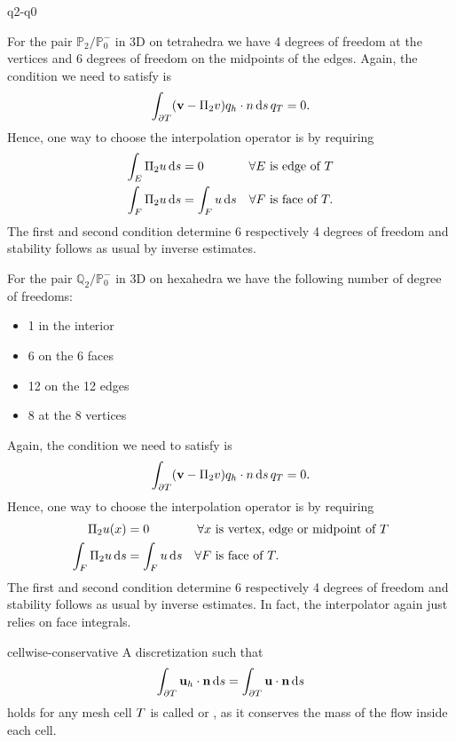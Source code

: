 \begin{Problem}{q2-q0}
\begin{solution}
  For the pair $\mathbb{P}_2/\mathbb{P}_0^-$ in 3D on tetrahedra we have
  4 degrees of freedom at the vertices and 6 degrees of freedom on the midpoints of the edges.
  Again, the condition we need to satisfy is
  \begin{align}
    \int_{\partial T} (\mathbf v-\Pi_2v)q_h \cdot n \,\mathrm{d} s \,q_T = 0.
  \end{align}
  Hence, one way to choose the interpolation operator is by requiring
  \begin{align}
    \int_E \Pi_2 u\,\mathrm{d} s &= 0           & \forall E &\text{ is edge of } T\\
    \int_F \Pi_2 u\,\mathrm{d} s &= \int_F u\,\mathrm{d} s & \forall F &\text{ is face of } T.
  \end{align}
  The first and second condition determine 6 respectively 4 degrees of freedom
  and stability follows as usual by inverse estimates.

  For the pair $\mathbb{Q}_2/\mathbb{P}_0^-$ in 3D on hexahedra we have the
  following number of degree of freedoms:
  \begin{itemize}
  \item 1 in the interior
  \item 6 on the 6 faces
  \item 12 on the 12 edges
  \item 8 at the 8 vertices
  \end{itemize}
  Again, the condition we need to satisfy is
  \begin{align}
    \int_{\partial T} (\mathbf v-\Pi_2v)q_h \cdot n \,\mathrm{d} s \,q_T = 0.
  \end{align}
  Hence, one way to choose the interpolation operator is by requiring
  \begin{align}
    \Pi_2 u(x)        &= 0           & \forall x &\text{ is vertex, edge or midpoint of } T\\
    \int_F \Pi_2 u\,\mathrm{d} s &= \int_F u\,\mathrm{d} s & \forall F &\text{ is face of } T.
  \end{align}
  The first and second condition determine 6 respectively 4 degrees of freedom
  and stability follows as usual by inverse estimates. In fact, the interpolator again
  just relies on face integrals.
\end{solution}
\end{Problem}

\begin{Definition}{cellwise-conservative}
  A discretization such that
  \begin{gather}
    \int_{\partial T} \mathbf u_h\cdot\mathbf n \,\mathrm{d} s = \int_{\partial T} \mathbf u\cdot \mathbf n \,\mathrm{d} s
  \end{gather}
  holds for any mesh cell $T$ is called  or , as it conserves
  the mass of the flow inside each cell.
\end{Definition}

